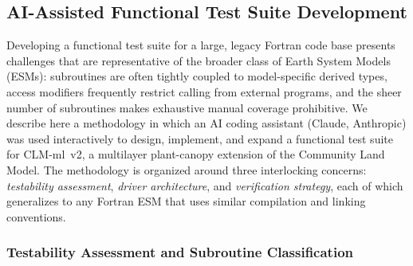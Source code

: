 
\subsection{AI-Assisted Functional Test Suite Development}

Developing a functional test suite for a large, legacy Fortran code base presents
challenges that are representative of the broader class of Earth System Models
(ESMs): subroutines are often tightly coupled to model-specific derived types,
access modifiers frequently restrict calling from external programs, and the sheer
number of subroutines makes exhaustive manual coverage prohibitive.  We describe
here a methodology in which an AI coding assistant (Claude, Anthropic) was used
interactively to design, implement, and expand a functional test suite for
CLM-ml~v2, a multilayer plant-canopy extension of the Community Land Model.  The
methodology is organized around three interlocking concerns: \emph{testability
assessment}, \emph{driver architecture}, and \emph{verification strategy}, each
of which generalizes to any Fortran ESM that uses similar compilation and linking
conventions.

\subsubsection{Testability Assessment and Subroutine Classification}

